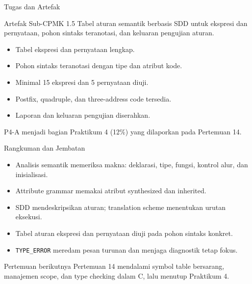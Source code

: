 \documentclass[aspectratio=169,10pt,t]{beamer}
\begin{document}
\begin{frame}{Tugas dan Artefak}
  \begin{block}{Artefak Sub-CPMK 1.5}
    Tabel aturan semantik berbasis SDD untuk ekspresi dan pernyataan,
    pohon sintaks teranotasi, dan keluaran pengujian aturan.
  \end{block}

  \small
  \begin{itemize}
    \item Tabel ekspresi dan pernyataan lengkap.
    \item Pohon sintaks teranotasi dengan tipe dan atribut kode.
    \item Minimal 15 ekspresi dan 5 pernyataan diuji.
    \item Postfix, quadruple, dan three-address code tersedia.
    \item Laporan dan keluaran pengujian diserahkan.
  \end{itemize}

  \vspace{3pt}
  {\footnotesize\color{ubbblue!75}P4-A menjadi bagian Praktikum 4
  (12\%) yang dilaporkan pada Pertemuan 14.}
\end{frame}

\begin{frame}{Rangkuman dan Jembatan}
  \begin{itemize}
    \item Analisis semantik memeriksa makna: deklarasi, tipe, fungsi,
          kontrol alur, dan inisialisasi.
    \item Attribute grammar memakai atribut synthesized dan inherited.
    \item SDD mendeskripsikan aturan; translation scheme menentukan
          urutan eksekusi.
    \item Tabel aturan ekspresi dan pernyataan diuji pada pohon
          sintaks konkret.
    \item \texttt{TYPE\_ERROR} meredam pesan turunan dan menjaga
          diagnostik tetap fokus.
  \end{itemize}

  \vspace{4pt}
  \begin{exampleblock}{Pertemuan berikutnya}
    Pertemuan 14 mendalami symbol table bersarang, manajemen scope,
    dan type checking dalam C, lalu menutup Praktikum 4.
  \end{exampleblock}
\end{frame}
\end{document}
